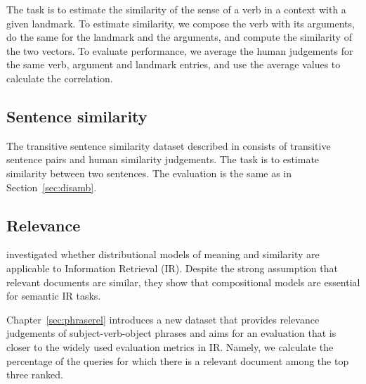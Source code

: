 The task is to estimate the similarity of the sense of a verb in a context with a given landmark. To estimate similarity, we compose the verb with its arguments, do the same for the landmark and the arguments, and compute the similarity of the two vectors. To evaluate performance, we average the human judgements for the same verb, argument and landmark entries, and use the average values to calculate the correlation.

\subsection{Sentence similarity}
\label{sec:sentence-similarity}

The transitive sentence similarity dataset described in  consists of transitive sentence pairs and human similarity judgements. The task is to estimate similarity between two sentences. The evaluation is the same as in Section~\ref{sec:disamb}.

\subsection{Relevance}
\label{sec:relevance}

 investigated whether distributional
models of meaning and similarity are applicable to Information Retrieval (IR). Despite the strong assumption that relevant documents are similar, they show that compositional models are essential for semantic IR tasks.

Chapter~\ref{sec:phraserel} introduces a new dataset that provides relevance judgements of subject-verb-object phrases and aims for an evaluation that is closer to the widely used evaluation metrics in IR. Namely, we calculate the percentage of the queries for which there is a relevant document among the top three ranked.

